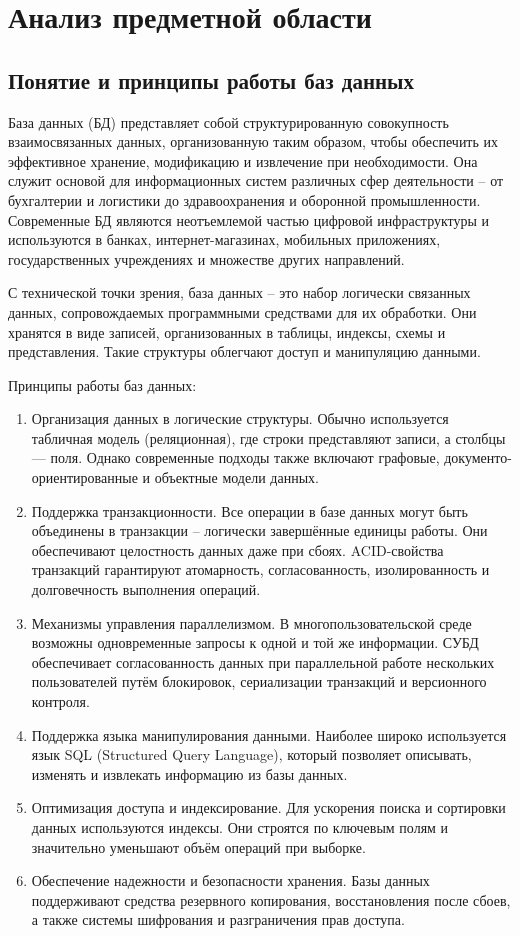 \section{Анализ предметной области}
\subsection{Понятие и принципы работы баз данных}

База данных (БД) представляет собой структурированную совокупность взаимосвязанных данных, организованную таким образом, чтобы обеспечить их эффективное хранение, модификацию и извлечение при необходимости. Она служит основой для информационных систем различных сфер деятельности -- от бухгалтерии и логистики до здравоохранения и оборонной промышленности. Современные БД являются неотъемлемой частью цифровой инфраструктуры и используются в банках, интернет-магазинах, мобильных приложениях, государственных учреждениях и множестве других направлений.

С технической точки зрения, база данных -- это набор логически связанных данных, сопровождаемых программными средствами для их обработки. Они хранятся в виде записей, организованных в таблицы, индексы, схемы и представления. Такие структуры облегчают доступ и манипуляцию данными.

Принципы работы баз данных:
\begin{enumerate}
	\item Организация данных в логические структуры.	
	Обычно используется табличная модель (реляционная), где строки представляют записи, а столбцы — поля. Однако современные подходы также включают графовые, документо-ориентированные и объектные модели данных.
	\item Поддержка транзакционности.	
	Все операции в базе данных могут быть объединены в транзакции -- логически завершённые единицы работы. Они обеспечивают целостность данных даже при сбоях. ACID-свойства транзакций гарантируют атомарность, согласованность, изолированность и долговечность выполнения операций.
	\item Механизмы управления параллелизмом.	
	В многопользовательской среде возможны одновременные запросы к одной и той же информации. СУБД обеспечивает согласованность данных при параллельной работе нескольких пользователей путём блокировок, сериализации транзакций и версионного контроля.
	\item Поддержка языка манипулирования данными.	
	Наиболее широко используется язык SQL (Structured Query Language), который позволяет описывать, изменять и извлекать информацию из базы данных.
	\item Оптимизация доступа и индексирование.	
	Для ускорения поиска и сортировки данных используются индексы. Они строятся по ключевым полям и значительно уменьшают объём операций при выборке.
	\item Обеспечение надежности и безопасности хранения.	
	Базы данных поддерживают средства резервного копирования, восстановления после сбоев, а также системы шифрования и разграничения прав доступа.
\end{enumerate}


